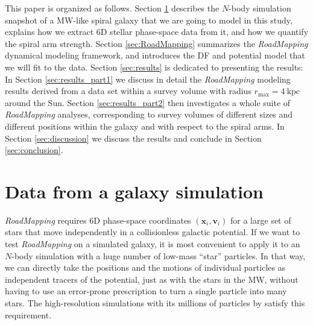 \documentclass[iop,revtex4,numberedappendix,appendixfloats]{emulateapj}
\newcommand{\vect}[1]{\boldsymbol{#1}}
\newcommand{\RM}{{\sl RoadMapping}}
\begin{document}
This paper is organized as follows. Section \ref{sec:simulation} describes the $N$-body simulation snapshot of a MW-like spiral galaxy that we are going to model in this study, explains how we extract 6D stellar phase-space data from it, and how we quantify the spiral arm strength. Section \ref{sec:RoadMapping} summarizes the \RM{} dynamical modeling framework, and introduces the DF and potential model that we will fit to the data. Section \ref{sec:results} is dedicated to presenting the results: In Section \ref{sec:results_part1} we discuss in detail the \RM{} modeling results derived from a data set within a survey volume with radius $r_\text{max}=4~\text{kpc}$ around the Sun. Section \ref{sec:results_part2} then investigates a whole suite of \RM{} analyses, corresponding to survey volumes of different sizes and different positions within the galaxy and with respect to the spiral arms. In Section \ref{sec:discussion} we discuss the results and conclude in Section \ref{sec:conclusion}.

\section{Data from a galaxy simulation} \label{sec:simulation}

\RM{} requires 6D phase-space coordinates $(\vect{x}_i,\vect{v}_i)$ for a large set of stars that move independently in a collisionless galactic potential. If we want to test \RM{} on a simulated galaxy, it is most convenient to apply it to an $N$-body simulation with a huge number of low-mass ``star'' particles. In that way, we can directly take the positions and the motions of individual particles as independent tracers of the potential, just as with the stars in the MW, without having to use an error-prone prescription to turn a single particle into many stars. The high-resolution simulations with its millions of particles by \citet{2013ApJ...766...34D} satisfy this requirement.
\end{document}
